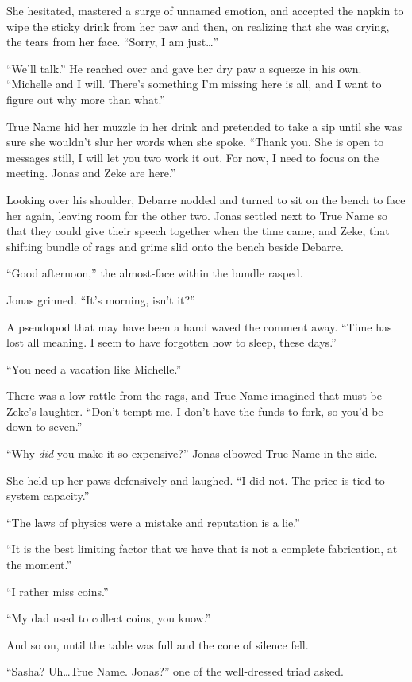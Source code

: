 She hesitated, mastered a surge of unnamed emotion, and accepted the napkin to wipe the sticky drink from her paw and then, on realizing that she was crying, the tears from her face. ``Sorry, I am just\ldots{}''

``We'll talk.'' He reached over and gave her dry paw a squeeze in his own. ``Michelle and I will. There's something I'm missing here is all, and I want to figure out why more than what.''

True Name hid her muzzle in her drink and pretended to take a sip until she was sure she wouldn't slur her words when she spoke. ``Thank you. She is open to messages still, I will let you two work it out. For now, I need to focus on the meeting. Jonas and Zeke are here.''

Looking over his shoulder, Debarre nodded and turned to sit on the bench to face her again, leaving room for the other two. Jonas settled next to True Name so that they could give their speech together when the time came, and Zeke, that shifting bundle of rags and grime slid onto the bench beside Debarre.

``Good afternoon,'' the almost-face within the bundle rasped.

Jonas grinned. ``It's morning, isn't it?''

A pseudopod that may have been a hand waved the comment away. ``Time has lost all meaning. I seem to have forgotten how to sleep, these days.''

``You need a vacation like Michelle.''

There was a low rattle from the rags, and True Name imagined that must be Zeke's laughter. ``Don't tempt me. I don't have the funds to fork, so you'd be down to seven.''

``Why \emph{did} you make it so expensive?'' Jonas elbowed True Name in the side.

She held up her paws defensively and laughed. ``I did not. The price is tied to system capacity.''

``The laws of physics were a mistake and reputation is a lie.''

``It is the best limiting factor that we have that is not a complete fabrication, at the moment.''

``I rather miss coins.''

``My dad used to collect coins, you know.''

And so on, until the table was full and the cone of silence fell.

``Sasha? Uh\ldots True Name. Jonas?'' one of the well-dressed triad asked.

